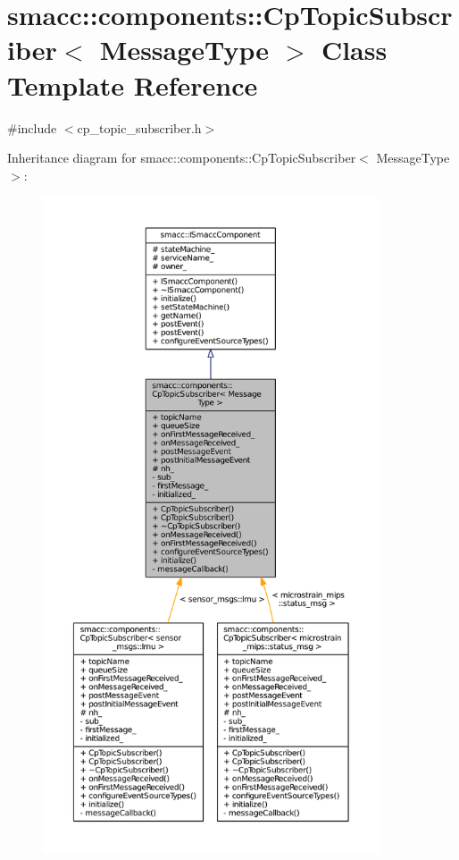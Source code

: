 \hypertarget{classsmacc_1_1components_1_1CpTopicSubscriber}{}\section{smacc\+:\+:components\+:\+:Cp\+Topic\+Subscriber$<$ Message\+Type $>$ Class Template Reference}
\label{classsmacc_1_1components_1_1CpTopicSubscriber}


{\ttfamily \#include $<$cp\+\_\+topic\+\_\+subscriber.\+h$>$}



Inheritance diagram for smacc\+:\+:components\+:\+:Cp\+Topic\+Subscriber$<$ Message\+Type $>$\+:
\nopagebreak
\begin{figure}[H]
\begin{center}
\leavevmode
\includegraphics[height=550pt]{classsmacc_1_1components_1_1CpTopicSubscriber__inherit__graph}
\end{center}
\end{figure}


